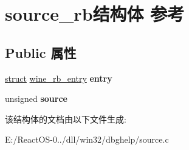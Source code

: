 \hypertarget{structsource__rb}{}\section{source\+\_\+rb结构体 参考}
\label{structsource__rb}
\subsection*{Public 属性}
\begin{DoxyCompactItemize}
\item 
\mbox{\label{structsource__rb_a7587534e9dd82254105fa82bcce43913}} 
\hyperlink{interfacestruct}{struct} \hyperlink{structwine__rb__entry}{wine\+\_\+rb\+\_\+entry} {\bfseries entry}
\item 
\mbox{\label{structsource__rb_a4444a21b14c58b02b567881c16317e71}} 
unsigned {\bfseries source}
\end{DoxyCompactItemize}


该结构体的文档由以下文件生成\+:\begin{DoxyCompactItemize}
\item 
E\+:/\+React\+O\+S-\/0../dll/win32/dbghelp/source.\+c\end{DoxyCompactItemize}
